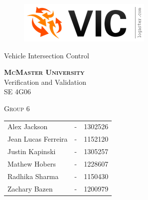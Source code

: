 \documentclass [10pt]{article}
\begin{document}
\begin {center} 

\thispagestyle{empty}
\vspace*{5cm}

\begin {figure}[h!]
\centering
\hspace{-10mm}\includegraphics [scale = .5, trim={.4cm 0 .8cm 0},clip] {figures/vic_logo.png}
\end {figure}

{\fontfamily{\cabinfamily}\selectfont
\Huge{Vehicle Intersection Control} }

\vspace{1 cm}
{\Large\textbf{\textsc{McMaster University}}\\}  \vspace {1cm}
{\Large Verification and Validation\\ \vspace {0.4 cm} SE 4G06}  \vspace {1cm}

{\large \textsc{Group 6} \\} \vspace{1cm}

\begin{tabular}{ l c  l}
Alex Jackson &-& 1302526\\
Jean Lucas Ferreira &-& 1152120 \\
Justin Kapinski &-& 1305257\\
Mathew Hobers &-& 1228607\\
Radhika Sharma &-& 1150430\\
Zachary Bazen &-& 1200979
\end{tabular}




\end{center}


\pagebreak


\tableofcontents
\listoftables



\pagebreak


\end{document}
